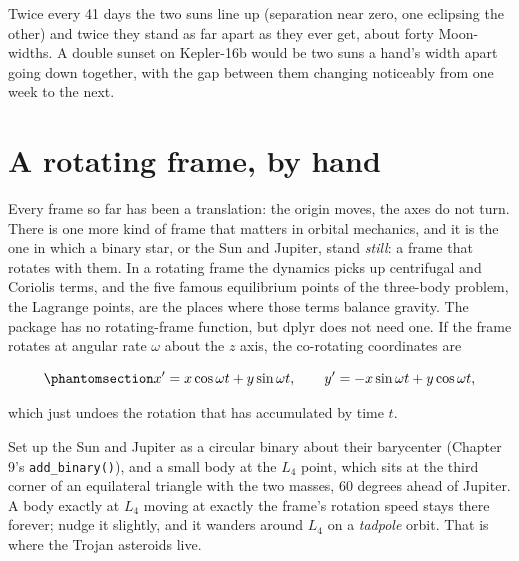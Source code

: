 \documentclass[
  10.5pt,
  letterpaper,
]{scrbook}
\theoremstyle{definition}
\theoremstyle{plain}
\theoremstyle{remark}
\begin{document}
Twice every 41 days the two suns line up (separation near zero, one
eclipsing the other) and twice they stand as far apart as they ever get,
about forty Moon-widths. A double sunset on Kepler-16b would be two suns
a hand's width apart going down together, with the gap between them
changing noticeably from one week to the next.

\section{A rotating frame, by hand}\label{a-rotating-frame-by-hand}

Every frame so far has been a translation: the origin moves, the axes do
not turn. There is one more kind of frame that matters in orbital
mechanics, and it is the one in which a binary star, or the Sun and
Jupiter, stand \emph{still}: a frame that rotates with them. In a
rotating frame the dynamics picks up centrifugal and Coriolis terms, and
the five famous equilibrium points of the three-body problem, the
Lagrange points, are the places where those terms balance gravity. The
package has no rotating-frame function, but dplyr does not need one. If
the frame rotates at angular rate \(\omega\) about the \(z\) axis, the
co-rotating coordinates are

\begin{equation}\protect\phantomsection\label{eq-corotating}{
x' = x\cos\omega t + y\sin\omega t, \qquad y' = -x\sin\omega t + y\cos\omega t,
}\end{equation}

which just undoes the rotation that has accumulated by time \(t\).

Set up the Sun and Jupiter as a circular binary about their barycenter
(Chapter 9's \texttt{add\_binary()}), and a small body at the \(L_4\)
point, which sits at the third corner of an equilateral triangle with
the two masses, 60 degrees ahead of Jupiter. A body exactly at \(L_4\)
moving at exactly the frame's rotation speed stays there forever; nudge
it slightly, and it wanders around \(L_4\) on a \emph{tadpole} orbit.
That is where the Trojan asteroids live.
\end{document}
